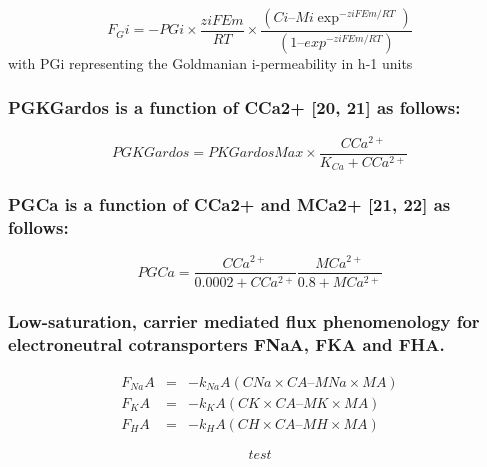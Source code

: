 \documentclass[a4paper]{article}
\newcommand{\med}[1]{M#1}
\newcommand{\cell}[1]{C#1}
\newcommand{\MA}{\med{A}}
\newcommand{\MNa}{\med{Na}}
\newcommand{\MK}{\med{K}}
\newcommand{\MCatp}{\med{Ca^{2+}}}
\newcommand{\MH}{\med{H}}
\newcommand{\KCa}{K_{Ca}}
\newcommand{\CNa}{\cell{Na}}
\newcommand{\CK}{\cell{K}}
\newcommand{\CH}{\cell{H}}
\newcommand{\CCatp}{\cell{Ca^{2+}}}
\newcommand{\CA}{\cell{A}}
\newcommand{\F}[2]{F_{#1}#2}
\newcommand{\kk}[2]{k_{#1}#2}
\begin{document}
\setcounter{equation}{12}
\renewcommand{\theequation}{\arabic{equation}}
\begin{equation}
\F{G}{i} = -PGi\times\frac{ziFEm}{RT}\times\frac{(Ci – Mi\exp^{-ziFEm/RT})}{(1 – exp^{-ziFEm/RT})}
\end{equation}
with PGi representing the Goldmanian i-permeability in h-1 units

\subsubsection{PGKGardos is a function of CCa2+ [20, 21] as follows:}
\begin{equation}
PGKGardos = PKGardosMax\times\frac{\CCatp}{\KCa + \CCatp}
\end{equation}

\subsubsection{PGCa is a function of CCa2+ and MCa2+ [21, 22] as follows:}
\begin{equation}
PGCa = \frac{\CCatp}{0.0002 + \CCatp}\frac{\MCatp}{0.8 + \MCatp}
\end{equation}

\subsubsection{Low-saturation, carrier mediated flux phenomenology for electroneutral cotransporters FNaA, FKA and FHA.}

\setcounter{equation}{0}
\renewcommand{\theequation}{16.\alph{equation}}
\begin{eqnarray}
\F{Na}{A} &=& - \kk{Na}{A}(\CNa\times\CA – \MNa\times\MA) \\
\F{K}{A} &=& - \kk{K}{A}(\CK\times\CA – \MK\times\MA) \\
\F{H}{A} &=& - \kk{H}{A}(\CH\times\CA – \MH\times\MA) 
\end{eqnarray}

\begin{equation}
test
\end{equation}
\end{document}
